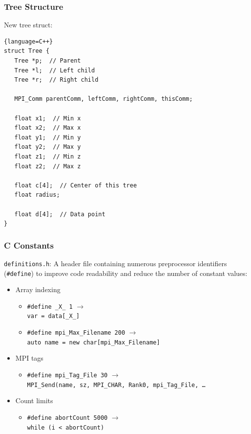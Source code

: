 \documentclass[usernames,dvipsnames]{beamer}
\begin{document}
\begin{frame}[fragile]
	\frametitle{Tree Structure}

\begin{block}{New tree struct:}
\lstset{
   basicstyle=\tiny
}
\begin{lstlisting}{language=C++}
struct Tree {
   Tree *p;  // Parent
   Tree *l;  // Left child
   Tree *r;  // Right child

   MPI_Comm parentComm, leftComm, rightComm, thisComm;

   float x1;  // Min x
   float x2;  // Max x
   float y1;  // Min y
   float y2;  // Max y
   float z1;  // Min z
   float z2;  // Max z

   float c[4];  // Center of this tree
   float radius;

   float d[4];  // Data point
}
\end{lstlisting}
\end{block}
\end{frame}


\begin{frame}
	\frametitle{C Constants}
	
    \begin{block}{\texttt{definitions.h}:}
        A header file containing numerous preprocessor identifiers (\texttt{\#define}) to improve code readability and reduce the number of constant values:
        \begin{itemize}
            \item Array indexing
                \begin{itemize}
                    \item \texttt{\#define \_X\_ 1} $\rightarrow$  \\
                    \texttt{var = data[\_X\_]}
                    \item \texttt{\#define mpi\_Max\_Filename 200} $\rightarrow$ \\
                    \texttt{auto name = new char[mpi\_Max\_Filename]}
                \end{itemize}
            \item MPI tags
                \begin{itemize}
                    \item \texttt{\#define mpi\_Tag\_File 30} $\rightarrow$ \\
                    \texttt{MPI\_Send(name, sz, MPI\_CHAR, Rank0, mpi\_Tag\_File, \ldots}
                \end{itemize}
            \item Count limits
                \begin{itemize}
                    \item \texttt{\#define abortCount 5000} $\rightarrow$ \\
                    \texttt{while (i < abortCount)}
                \end{itemize}
    		\end{itemize}
    	\end{block}
		
\end{frame}
\end{document}
